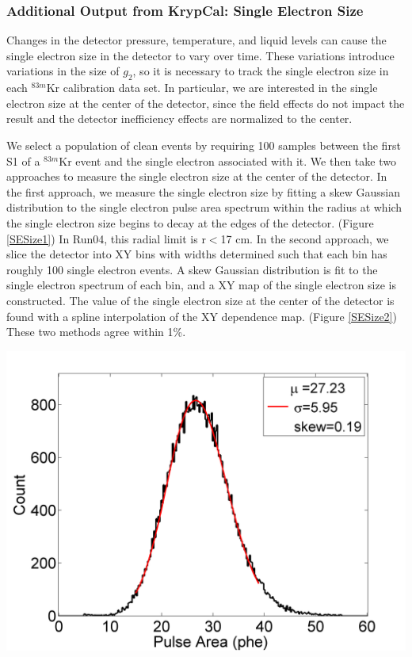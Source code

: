 \documentclass[a4paper,12pt]{article}
\begin{document}
{\subsubsection{Additional Output from KrypCal: Single Electron Size}

Changes in the detector pressure, temperature, and liquid levels can cause the single electron size in the detector to vary over time.  These variations introduce variations in the size of $g_2$, so it is necessary to track the single electron size in each $^{83m}$Kr calibration data set.  In particular, we are interested in the single electron size at the center of the detector, since the field effects do not impact the result and the detector inefficiency effects are normalized to the center. 

We select a population of clean events by requiring 100 samples between the first S1 of a $^{83m}$Kr event and the single electron associated with it.  We then take two approaches to measure the single electron size at the center of the detector.  In the first approach, we measure the single electron size by fitting a skew Gaussian distribution to the single electron pulse area spectrum within the radius at which the single electron size begins to decay at the edges of the detector. (Figure \ref{SESize1}) In Run04, this radial limit is r$<$17 cm. In the second approach, we slice the detector into XY bins with widths determined such that each bin has roughly 100 single electron events.  A skew Gaussian distribution is fit to the single electron spectrum of each bin, and a XY map of the single electron size is constructed.  The value of the single electron size at the center of the detector is found with a spline interpolation of the XY dependence map.  (Figure \ref{SESize2})  These two methods agree within 1\%.

\begin{center}
\includegraphics[scale=0.5]{Run04Corrections/SESizeExample.png}
 \label{SESize1}
\end{center}

}
\end{document}

